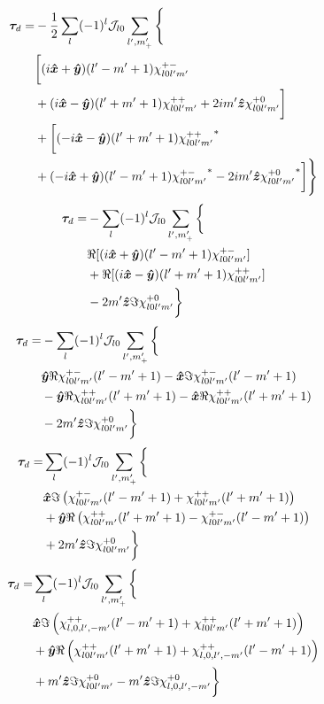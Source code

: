 \documentclass[aps,twocolumn,secnumarabic,balancelastpage,amsmath,amssymb,nofootinbib,floatfix]{revtex4-1}
\begin{document}
\begin{equation*}
\begin{aligned}
\bm \tau_d = &-\frac{1}{2}\sum_{l}(-1)^l\mathcal{J}_{l0}\sum_{l',m'_+}\Bigg\{ \\
&\bigg[(i\bm{\hat x} + \bm{\hat y})(l'-m'+1)\chi_{l0l'm'}^{+-}\\
&+(i\bm{\hat x}-\bm{\hat y})(l'+m'+1)\chi_{l0l'm'}^{++} +2im'\bm{\hat z} \chi_{l0l'm'}^{+0}\bigg]\\
&+\bigg[(-i\bm{\hat x} - \bm{\hat y})(l'+m'+1){\chi_{l0l'm'}^{++}}^*\\
&+(-i\bm{\hat x}+\bm{\hat y})(l'-m'+1){\chi_{l0l'm'}^{+-}}^* -2im'\bm{\hat z} {\chi_{l0l'm'}^{+0}}^*\bigg]\Bigg\}
\end{aligned}
\end{equation*}
\begin{equation*}
\begin{aligned}
\bm \tau_d = &-\sum_{l}(-1)^l\mathcal{J}_{l0}\sum_{l',m'_+}\bigg\{ \\
&\Re[(i\bm{\hat x} + \bm{\hat y})(l'-m'+1)\chi_{l0l'm'}^{+-}]\\
&+\Re[(i\bm{\hat x}-\bm{\hat y})(l'+m'+1)\chi_{l0l'm'}^{++}]\\
&-2m'\bm{\hat z} \Im\chi_{l0l'm'}^{+0}\bigg\}
\end{aligned}
\end{equation*}
\begin{equation*}
\begin{aligned}
\bm \tau_d = &-\sum_{l}(-1)^l\mathcal{J}_{l0}\sum_{l',m'_+}\bigg\{ \\
&\bm{\hat y}\Re\chi_{l0l'm'}^{+-}(l'-m'+1) - \bm{\hat x}\Im\chi_{l0l'm'}^{+-}(l'-m'+1)\\
&-\bm{\hat y}\Re\chi_{l0l'm'}^{++}(l'+m'+1) - \bm{\hat x}\Re\chi_{l0l'm'}^{++}(l'+m'+1)\\
&-2m'\bm{\hat z} \Im\chi_{l0l'm'}^{+0}\bigg\}
\end{aligned}
\end{equation*}
\begin{equation*}
\begin{aligned}
\bm \tau_d = &\sum_{l}(-1)^l\mathcal{J}_{l0}\sum_{l',m'_+}\bigg\{ \\
&\bm{\hat x}\Im\left( \chi_{l0l'm'}^{+-}(l'-m'+1) +\chi_{l0l'm'}^{++}(l'+m'+1) \right)\\
&+\bm{\hat y}\Re\left( \chi_{l0l'm'}^{++}(l'+m'+1)-\chi_{l0l'm'}^{+-}(l'-m'+1) \right)\\
&+2m'\bm{\hat z} \Im\chi_{l0l'm'}^{+0}\bigg\}
\end{aligned}
\end{equation*}
\begin{equation*}
\begin{aligned}
\bm \tau_d = &\sum_{l}(-1)^l\mathcal{J}_{l0}\sum_{l',m'_+}\bigg\{ \\
&\bm{\hat x}\Im\left( \chi_{l,0,l',-m'}^{++}(l'-m'+1) +\chi_{l0l'm'}^{++}(l'+m'+1) \right)\\
&+\bm{\hat y}\Re\left( \chi_{l0l'm'}^{++}(l'+m'+1)+\chi_{l,0,l',-m'}^{++}(l'-m'+1) \right)\\
&+m'\bm{\hat z} \Im\chi_{l0l'm'}^{+0}-m'\bm{\hat z} \Im\chi_{l,0,l',-m'}^{+0}\bigg\}
\end{aligned}
\end{equation*}
\end{document}
